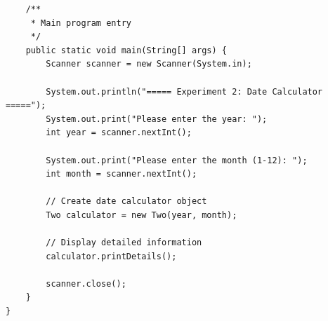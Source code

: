 \documentclass[12pt,a4paper]{article}
\begin{document}
\begin{lstlisting}
    /**
     * Main program entry
     */
    public static void main(String[] args) {
        Scanner scanner = new Scanner(System.in);
        
        System.out.println("===== Experiment 2: Date Calculator =====");
        System.out.print("Please enter the year: ");
        int year = scanner.nextInt();
        
        System.out.print("Please enter the month (1-12): ");
        int month = scanner.nextInt();
        
        // Create date calculator object
        Two calculator = new Two(year, month);
        
        // Display detailed information
        calculator.printDetails();
        
        scanner.close();
    }
}
\end{lstlisting}
\end{document}

